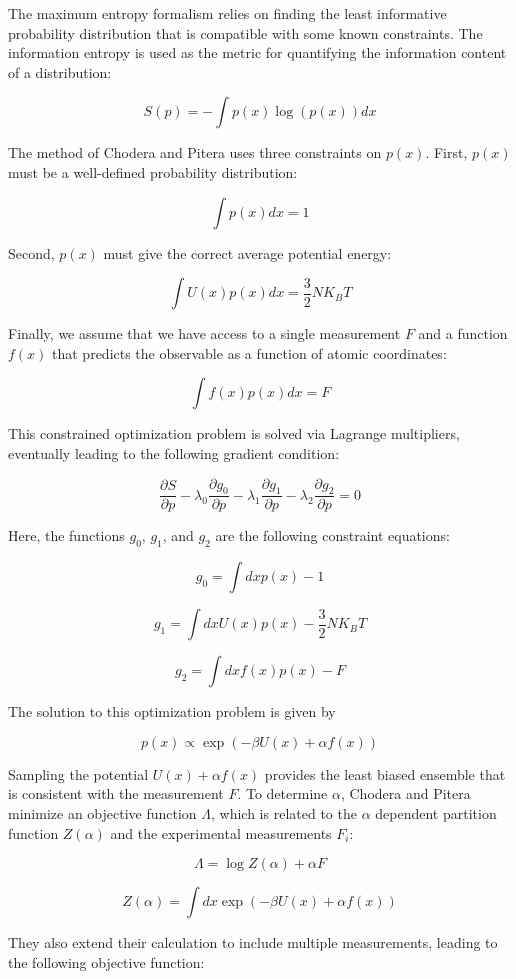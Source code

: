\documentclass[12pt]{article}
\begin{document}
The maximum entropy formalism relies on finding the least informative probability distribution that is compatible with some known constraints.  The information entropy is used as the metric for quantifying the information content of a distribution:

$$S(p) = - \int p(x) \log(p(x)) dx $$

The method of Chodera and Pitera uses three constraints on $p(x)$.  First, $p(x)$ must be a well-defined probability distribution:

$$\int p(x) dx = 1 $$

Second, $p(x)$ must give the correct average potential energy:

$$\int U(x) p(x) dx = \frac{3}{2} N K_B T$$

Finally, we assume that we have access to a single measurement $F$ and a function $f(x)$ that predicts the observable as a function of atomic coordinates:

$$\int f(x) p(x) dx = F$$

This constrained optimization problem is solved via Lagrange multipliers, eventually leading to the following gradient condition:

$$\frac{\partial S}{\partial p} - \lambda_0 \frac{\partial g_0}{\partial p}- \lambda_1 \frac{\partial g_1}{\partial p}- \lambda_2 \frac{\partial g_2}{\partial p} = 0$$

Here, the functions $g_0$, $g_1$, and $g_2$ are the following constraint equations:

$$g_0 = \int dx p(x) - 1$$

$$g_1 = \int dx U(x) p(x) - \frac{3}{2} N K_B T$$

$$g_2 = \int dx f(x) p(x) - F$$

The solution to this optimization problem is given by 

$$p(x) \propto \exp(-\beta U(x) + \alpha f(x))$$

Sampling the potential $U(x) + \alpha f(x)$ provides the least biased ensemble that is consistent with the measurement $F$.  To determine $\alpha$, Chodera and Pitera minimize an objective function $\Lambda$, which is related to the $\alpha$ dependent partition function $Z(\alpha)$ and the experimental measurements $F_i$:

$$\Lambda = \log Z(\alpha) + \alpha F$$

$$Z(\alpha) = \int dx \exp(-\beta U(x) + \alpha f(x))$$

They also extend their calculation to include multiple measurements, leading to the following objective function:
\end{document}
